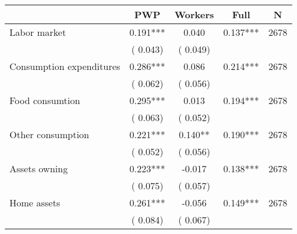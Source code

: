 
\begin{tabular}{l*{4}{c}}\hline&\multicolumn{1}{c}{PWP}&\multicolumn{1}{c}{Workers}&\multicolumn{1}{c}{Full}&\multicolumn{1}{c}{N} \\ \hline

 Labor market &              0.191*** &         0.040 &           0.137*** & 2678                       \\  
                 &        (       0.043)                   &        (       0.049)                        &                                                             &                                                      \\      

 Consumption expenditures &              0.286*** &         0.086 &           0.214*** & 2678                       \\  
                 &        (       0.062)                   &        (       0.056)                        &                                                             &                                                      \\      

 Food consumtion &              0.295*** &         0.013 &           0.194*** & 2678                       \\  
                 &        (       0.063)                   &        (       0.052)                        &                                                             &                                                      \\      

 Other consumption &              0.221*** &         0.140** &           0.190*** & 2678                       \\  
                 &        (       0.052)                   &        (       0.056)                        &                                                             &                                                      \\      

 Assets owning &              0.223*** &        -0.017 &           0.138*** & 2678                       \\  
                 &        (       0.075)                   &        (       0.057)                        &                                                             &                                                      \\      

 Home assets &              0.261*** &        -0.056 &           0.149*** & 2678                       \\  
                 &        (       0.084)                   &        (       0.067)                        &                                                             &                                                      \\      


\end{tabular}
